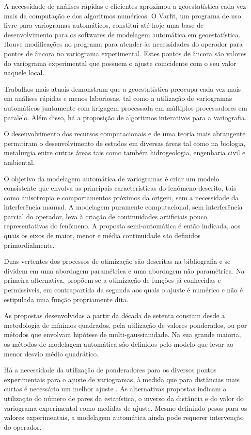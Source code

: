 A necessidade de análises rápidas e eficientes aproximou a geoestatística cada vez mais da computação e dos algoritmos numéricos. O Varfit, um programa de uso livre para variogramas automáticos, constitui até hoje uma base de desenvolvimento para os softwares de modelagem automática em geoestatística. Houve modificações no programa para atender às necessidades do operador para pontos de âncora no variograma experimental. Estes pontos de âncora são valores do variograma experimental que possuem o ajuste coincidente com o seu valor naquele local.

Trabalhos mais atuais demonstram que a geoestatística preocupa cada vez mais em análises rápidas e menos laboriosas, tal como a utilização de variogramas automáticos juntamente com krigagem processada em múltiplos processadores em paralelo. Além disso, há a proposição de algoritmos interativos para a variografia. 

O desenvolvimento dos recursos computacionais e de uma teoria mais abrangente  permitiram o desenvolvimento de estudos em diversas áreas tal como na biologia, metalurgia entre outras áreas tais como também hidrogeologia, engenharia civil e ambiental. 

O objetivo da modelagem automática de variogramas é criar um modelo consistente que envolva as principais características do fenômeno descrito, tais como anisotropia e comportamentos próximos da origem, sem a necessidade da interferência manual. A modelagem puramente computacional, sem interferência parcial do operador, leva à criação de continuidades artificiais pouco representativas do fenômeno. A proposta semi-automática é então indicada, aos quais os eixos de maior, menor e média continuidade são definidos primordialmente. 

Duas vertentes dos processos de otimização são descritas na bibliografia e se dividem em uma abordagem paramétrica e uma abordagem não paramétrica. Na primeira alternativa, propõem-se a otimização de funções já conhecidas e permissíveis, em contrapartida da segunda aos quais o ajuste é numérico e não é estipulada uma função propriamente dita. 

As propostas desenvolvidas a partir da década de setenta constam desde a metodologia de mínimos quadrados, pela utilização de valores ponderados, ou por métodos que envolvam hipótese de multi-gaussianidade.  
Na sua grande maioria, os métodos de modelagem automática são definidos pelo modelo que levar ao menor desvio médio quadrático. 

Há a necessidade da utilização de ponderadores para os diversos pontos experimentais para o ajuste de variogramas, à medida que para distâncias mais curtas é necessário um melhor ajuste . As alternativas propostas indicam a utilização do número de pares da estatística, o inverso da distância e do valor do variograma experimental como medidas de ajuste. Mesmo definindo pesos para os valores experimentais, a modelagem automática ainda pode requerer intervenção do operador. 

